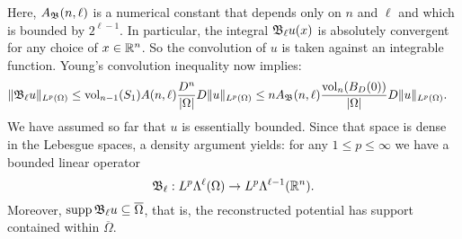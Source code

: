 \documentclass[12pt,a4paper]{article}
\begin{document}
Here, $A_{{\mathfrak B}}(n,\ell)$ is a numerical constant that depends only on $n$ and $\ell$ 
and which is bounded by $2^{\ell-1}$. 
In particular, the integral ${\mathfrak B}_{\ell} u(x)$ is absolutely convergent for any choice of $x \in {\mathbb R}^{n}$. 
So the convolution of $u$ is taken against an integrable function. 
Young's convolution inequality now implies: 
\begin{align*}
    \| {\mathfrak B}_{\ell} u \|_{L^{p}(\Omega)}
    &\leq 
    \operatorname{vol}_{n-1}(S_1) A(n,\ell) \frac{ D^{n} }{|\Omega|} 
    D
    \| u \|_{L^{p}(\Omega)}
    \leq 
    n A_{{\mathfrak B}}(n,\ell) \frac{ \operatorname{vol}_{n}(B_D(0)) }{|\Omega|} 
    D
    \| u \|_{L^{p}(\Omega)}
    .
\end{align*}
We have assumed so far that $u$ is essentially bounded.
Since that space is dense in the Lebesgue spaces, a density argument yields: 
for any $1 \leq p \leq \infty$ we have a bounded linear operator 
\[
    {\mathfrak B}_{\ell} : L^{p}\Lambda^{\ell}(\Omega) \rightarrow L^{p}\Lambda^{\ell-1}({\mathbb R}^n).
\]
Moreover, $\operatorname{supp} {\mathfrak B}_{\ell} u \subseteq \overline\Omega$,
that is, the reconstructed potential has support contained within $\overline\Omega$. 
\\
\end{document}
